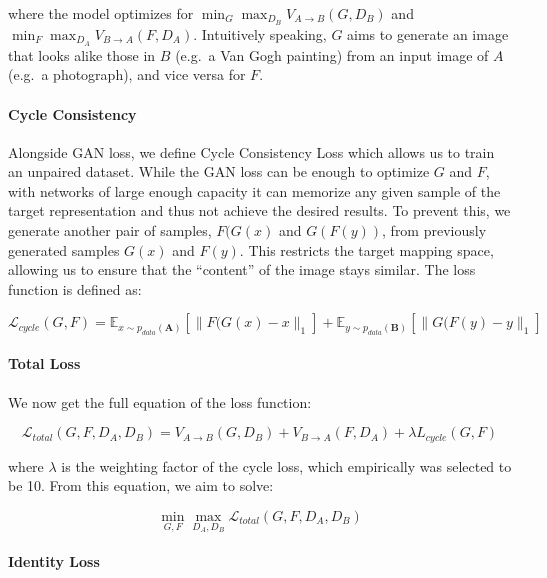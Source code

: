 \documentclass[12pt,a4paper,]{report}
\begin{document}
where the model optimizes for
\(\displaystyle \min_G \max_{D_B} V_{A \rightarrow B}(G, D_B)\) and
\(\displaystyle \min_F \max_{D_A} V_{B \rightarrow A}(F, D_A)\).
Intuitively speaking, \(G\) aims to generate an image that looks alike
those in \(B\) (e.g.~a Van Gogh painting) from an input image of \(A\)
(e.g.~a photograph), and vice versa for \(F\).

\paragraph{Cycle Consistency}

Alongside GAN loss, we define Cycle Consistency Loss which allows us to
train an unpaired dataset. While the GAN loss can be enough to optimize
\(G\) and \(F\), with networks of large enough capacity it can memorize
any given sample of the target representation and thus not achieve the
desired results. To prevent this, we generate another pair of samples,
\(F(G(x)\) and \(G(F(y))\), from previously generated samples \(G(x)\)
and \(F(y)\). This restricts the target mapping space, allowing us to
ensure that the ``content'' of the image stays similar. The loss
function is defined as:

\begin{equation}
    \mathcal{L}_{cycle}(G, F) = \mathbb{E}_{x \sim p_{data}(\mathbf{A})}[\|F(G(x) - x\|_1] + \mathbb{E}_{y \sim p_{data}(\mathbf{B})}[\|G(F(y) - y\|_1]
\end{equation}

\paragraph{Total Loss}

We now get the full equation of the loss function:

\begin{equation}
    \mathcal{L}_{total}(G, F, D_A, D_B) = V_{A \rightarrow B}(G, D_B) + V_{B \rightarrow A}(F, D_A) + \lambda L_{cycle}(G, F) \label{eq:cyclegan_total}
\end{equation}

where \(\lambda\) is the weighting factor of the cycle loss, which
empirically was selected to be 10. From this equation, we aim to solve:

\begin{equation}
    \min_{G, F} \max_{D_A, D_B} \mathcal{L}_{total}(G, F, D_A, D_B)
\end{equation}

\paragraph{Identity Loss \label{identity-loss}}
\end{document}
